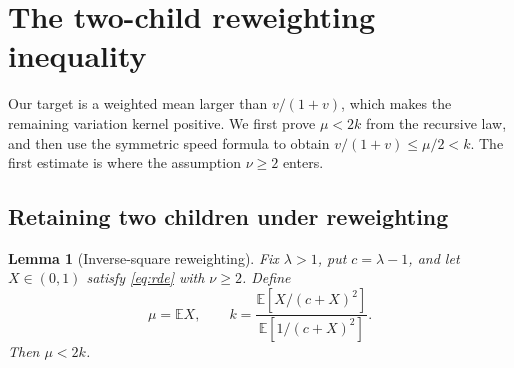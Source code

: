 \documentclass[11pt,a4paper]{article}
\numberwithin{equation}{section}
\theoremstyle{notethm}
\newtheorem{lemma}[lemma]{Lemma}
\theoremstyle{definition}
\newcommand{\E}{\mathbb E}
\begin{document}
\section{The two-child reweighting inequality}\label{sec:tilt}

Our target is a weighted mean larger than $v/(1+v)$, which makes the
remaining variation kernel positive. We first prove $\mu<2k$ from the
recursive law, and then use the symmetric speed formula to obtain
$v/(1+v)\le\mu/2<k$. The first estimate is where the assumption
$\nu\ge2$ enters.

\subsection{Retaining two children under reweighting}

\begin{lemma}[Inverse-square reweighting]\label{lem:tilt}
Fix $\lambda>1$, put $c=\lambda-1$, and let $X\in(0,1)$ satisfy
\eqref{eq:rde} with $\nu\ge2$. Define
\begin{equation}\label{eq:mu-k}
 \mu=\E X,\qquad
 k=\frac{\E[X/(c+X)^2]}{\E[1/(c+X)^2]}.
\end{equation}
Then $\mu<2k$.
\end{lemma}
\end{document}
